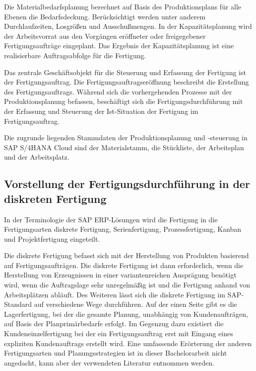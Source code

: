 Die Materialbedarfsplanung berechnet auf Basis des Produktionsplans für alle Ebenen die Bedarfsdeckung. Berücksichtigt werden unter anderem Durchlaufzeiten, Losgrößen und Ausschußmengen.
In der Kapazitätsplanung wird der Arbeitsvorrat aus den Vorgängen eröffneter oder freigegebener Fertigungsaufträge eingeplant. Das Ergebnis der Kapazitätsplanung ist eine realisierbare Auftragsabfolge für die Fertigung.
\cite{Dickersbach.2014} 

Das zentrale Geschäftsobjekt für die Steuerung und Erfassung der Fertigung ist der Fertigungsauftrag. Die Fertigungsauftragseröffnung beschreibt die Erstellung des Fertigungsauftrags. 
Während sich die vorhergehenden Prozesse mit der Produktionsplanung befassen, beschäftigt sich die Fertigungsdurchführung mit der Erfassung und Steuerung der Ist-Situation der Fertigung im Fertigungsauftrag.
\cite{Dickersbach.2014} 

Die zugrunde liegenden Stammdaten der Produktionsplanung und -steuerung in SAP S/4HANA Cloud sind der Materialstamm, die Stückliste, der Arbeitsplan und der Arbeitsplatz. 
\cite{Dickersbach.2014}

\subsection{Vorstellung der Fertigungsdurchführung in der diskreten Fertigung}
In der Terminologie der SAP \ac{ERP}-Lösungen wird die Fertigung in die Fertigungsarten diskrete Fertigung, Serienfertigung, Prozessfertigung, Kanban und Projektfertigung eingeteilt. 

Die diskrete Fertigung befasst sich mit der Herstellung von Produkten basierend auf Fertigungsaufträgen. 
Die diskrete Fertigung ist dann erforderlich, wenn die Herstellung von Erzeugnissen in einer variantenreichen Ausprägung benötigt wird, wenn die Auftragslage sehr unregelmäßig ist und die Fertigung anhand von Arbeitsplätzen abläuft. 
\cite{Mathieu.2014}
Des Weiteren lässt sich die diskrete Fertigung im SAP-Standard auf verschiedene Wege durchführen. Auf der einen Seite gibt es die Lagerfertigung, bei der die gesamte Planung, unabhängig von Kundenaufträgen, auf Basis der Planprimärbedarfe erfolgt. Im Gegenzug dazu existiert die Kundeneinzelfertigung bei der ein Fertigungsauftrag erst mit Eingang eines expliziten Kundenauftrags erstellt wird. Eine umfassende Erörterung der anderen Fertigungsarten und Planungsstrategien ist in dieser Bachelorarbeit nicht angedacht, kann aber der verwendeten Literatur entnommen werden.
\cite{Dickersbach.2014}

